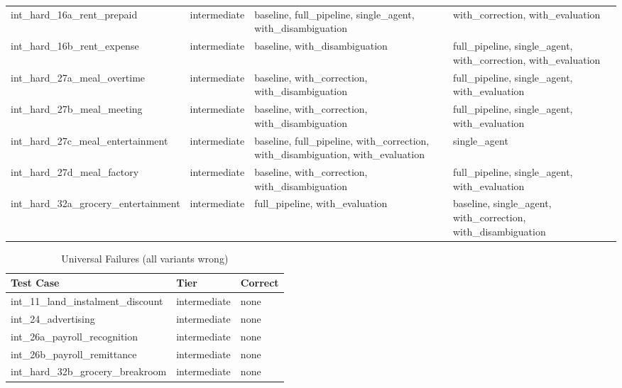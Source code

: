 \begin{table}[htbp]
{\begin{tabular}{l l l l}
  int\_hard\_16a\_rent\_prepaid & intermediate & baseline, full\_pipeline, single\_agent, with\_disambiguation & with\_correction, with\_evaluation \\
  int\_hard\_16b\_rent\_expense & intermediate & baseline, with\_disambiguation & full\_pipeline, single\_agent, with\_correction, with\_evaluation \\
  int\_hard\_27a\_meal\_overtime & intermediate & baseline, with\_correction, with\_disambiguation & full\_pipeline, single\_agent, with\_evaluation \\
  int\_hard\_27b\_meal\_meeting & intermediate & baseline, with\_correction, with\_disambiguation & full\_pipeline, single\_agent, with\_evaluation \\
  int\_hard\_27c\_meal\_entertainment & intermediate & baseline, full\_pipeline, with\_correction, with\_disambiguation, with\_evaluation & single\_agent \\
  int\_hard\_27d\_meal\_factory & intermediate & baseline, with\_correction, with\_disambiguation & full\_pipeline, single\_agent, with\_evaluation \\
  int\_hard\_32a\_grocery\_entertainment & intermediate & full\_pipeline, with\_evaluation & baseline, single\_agent, with\_correction, with\_disambiguation \\
\bottomrule
\end{tabular}}\end{table}

\begin{table}[htbp]
\centering
\caption{Universal Failures (all variants wrong)}
\label{tab:all-fail}
\begin{tabular}{l l l}
\toprule
Test Case & Tier & Correct \\
\midrule
  int\_11\_land\_instalment\_discount & intermediate & none \\
  int\_24\_advertising & intermediate & none \\
  int\_26a\_payroll\_recognition & intermediate & none \\
  int\_26b\_payroll\_remittance & intermediate & none \\
  int\_hard\_32b\_grocery\_breakroom & intermediate & none \\
\bottomrule
\end{tabular}
\end{table}
